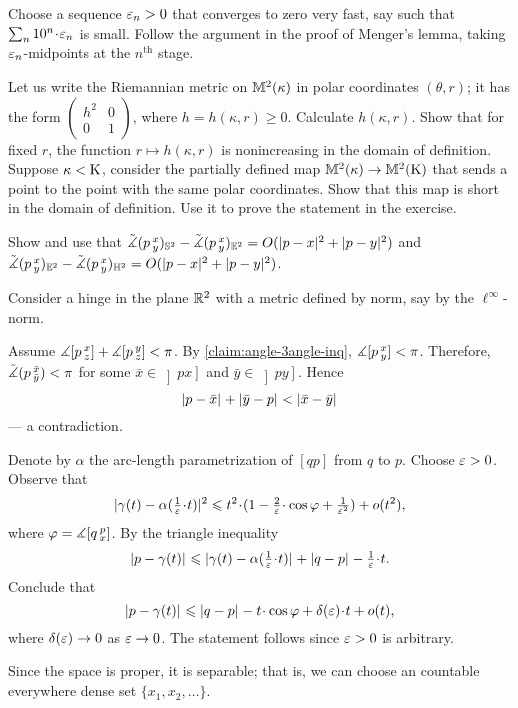 Choose a sequence $\eps_n>0$ that converges to zero very fast, say such that $\sum_n10^n\cdot \eps_n$ is small.
Follow the argument in the proof of Menger's lemma, taking $\eps_n$-midpoints at the $n^{\text{th}}$ stage.

Let us write the Riemannian metric on $\MM^2(\kappa)$ in polar coordinates $(\theta,r)$;
it has the form 
$(\begin{smallmatrix}
h^2&0
\\
0&1
\end{smallmatrix})$, where $h=h(\kappa,r)\ge 0$.
Calculate $h(\kappa,r)$.
Show that for fixed $r$, the function $r\mapsto h(\kappa,r)$ is nonincreasing in the domain of definition.
Suppose $\kappa<\Kappa$, consider the partially defined map $\MM^2(\kappa)\to\MM^2(\Kappa)$ that sends a point to the point with the same polar coordinates.
Show that this map is short in the domain of definition.
Use it to prove the statement in the exercise.


 Show and use that 
$\angk p{x}{y}_{\SSS^2}-\angk p{x}{y}_{\EE^2}=O(\dist[2]{p}{x}{}+\dist[2]{p}{y}{})$
and 
$\angk p{x}{y}_{\EE^2}-\angk p{x}{y}_{\HH^2}=O(\dist[2]{p}{x}{}+\dist[2]{p}{y}{})$.

Consider a hinge in the plane $\RR^2$ with a metric defined by norm, say by the $\ell^\infty$-norm.

Assume $\mangle\hinge pxz+\mangle\hinge pyz<\pi$.
By \ref{claim:angle-3angle-inq}, $\mangle\hinge pxy<\pi$.
Therefore,
$\angk p{\bar x}{\bar y}<\pi$
for some $\bar x\in \left]px\right]$ and $\bar y\in \left]py\right]$.
Hence 
\[\dist p{\bar x}{}+\dist {\bar y}p{}<\dist {\bar x}{\bar y}{}\]
--- a contradiction.

Denote by $\alpha$ the arc-length parametrization of $[qp]$ from $q$ to $p$.
Choose $\eps>0$.
Observe that 
\[\dist[2]{\gamma(t)}{\alpha(\tfrac1\eps\cdot t)}{}\le t^2\cdot(1-\tfrac2\eps\cdot\cos\phi+\tfrac1{\eps^2})+o(t^2),\]
where $\phi=\mangle\hinge q p x$.
By the triangle  inequality
\[\dist{p}{\gamma(t)}{}\le \dist{\gamma(t)}{\alpha(\tfrac1\eps\cdot t)}{}+\dist{q}{p}{}-\tfrac1\eps\cdot t.\]
Conclude that
\[\dist{p}{\gamma(t)}{}
\le
\dist{q}{p}{}-t\cdot \cos \phi+\delta(\eps)\cdot t+o(t),\]
where $\delta(\eps)\to 0$ as $\eps\to0$.
The statement follows since $\eps>0$ is arbitrary.

Since the space is proper, it is separable; 
that is, we can choose an countable everywhere dense set $\{x_1,x_2,\dots\}$.


